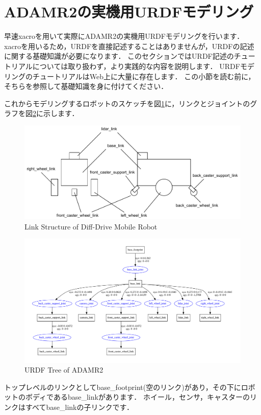 \documentclass[{../../master}]{subfiles}
\begin{document}
\section{ADAMR2の実機用URDFモデリング}

早速\textsf{xacro}を用いて実際にADAMR2の実機用URDFモデリングを行います．
\textsf{xacro}を用いるため，URDFを直接記述することはありませんが，URDFの記述に関する基礎知識が必要になります．
このセクションではURDF記述のチュートリアルについては取り扱わず，より実践的な内容を説明します．
URDFモデリングのチュートリアルはWeb上に大量に存在します．
この小節を読む前に，そちらを参照して基礎知識を身に付けてください．

これからモデリングするロボットのスケッチを図\ref{fig:mobile_robot_structure}に，リンクとジョイントのグラフを図\ref{fig:adamr2_urdf_tree}に示します．

\begin{figure}[ht]
  \centering
  \includegraphics[width=100truemm, clip]{images/mobile_robot_structure.pdf}
  \caption{Link Structure of Diff-Drive Mobile Robot}
  \label{fig:mobile_robot_structure}
\end{figure}

\begin{figure}[ht]
  \centering
  \includegraphics[width=100truemm, clip]{images/adamr2_urdf_tree.pdf}
  \caption{URDF Tree of ADAMR2}
  \label{fig:adamr2_urdf_tree}
\end{figure}

トップレベルのリンクとして\textsf{base\_footprint}(空のリンク)があり，その下にロボットのボディである\textsf{base\_link}があります．
ホイール，センサ，キャスターのリンクはすべて\textsf{base\_link}の子リンクです．
\end{document}
